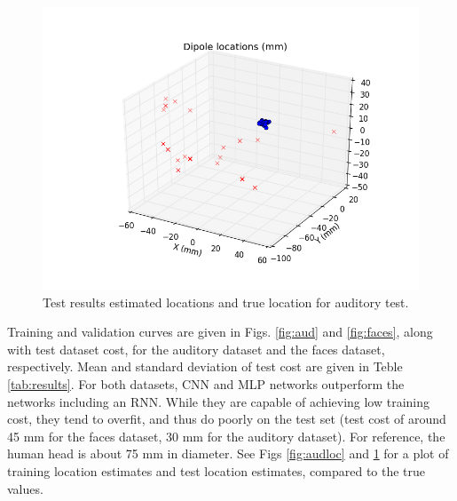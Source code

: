 \documentclass[journal,12pt,onecolumn,draftclsnofoot]{IEEEtran}
\begin{document}
\begin{figure}[h!]
\centering
\includegraphics[width=5in]{finalplots/tf1_0_subject_aud_pca_all_True_rand_True_cnn_True_rnn_False_locate_1_treat_None}
\caption{Test results estimated locations and true location for auditory test.}
\label{fig:audloctest}
\end{figure}

Training and validation curves are given in Figs. \ref{fig:aud} and \ref{fig:faces}, along with test dataset cost, for the auditory dataset and the faces dataset, respectively. Mean and standard deviation of test cost are given in Teble \ref{tab:results}. For both datasets, CNN and MLP networks outperform the networks including an RNN. While they are capable of achieving low training cost, they tend to overfit, and thus do poorly on the test set (test cost of around 45 mm for the faces dataset, 30 mm for the auditory dataset). For reference, the human head is about 75 mm in diameter. See Figs \ref{fig:audloc} and \ref{fig:audloctest} for a plot of training location estimates and test location estimates, compared to the true values.
\end{document}
